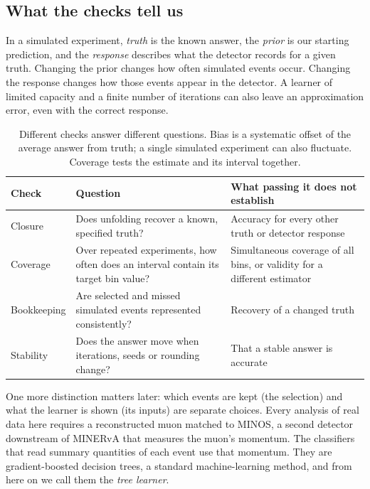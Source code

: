 \subsection*{What the checks tell us}

In a simulated experiment, \emph{truth} is the known answer, the \emph{prior} is our starting prediction, and the \emph{response} describes what the detector records for a given truth. Changing the prior changes how often simulated events occur. Changing the response changes how those events appear in the detector. A learner of limited capacity and a finite number of iterations can also leave an approximation error, even with the correct response.

\begin{table}[H]
\centering\small
\begin{tabular}{@{}p{}p{}p{}@{}}
\toprule
Check & Question & What passing it does not establish \\
\midrule
Closure & Does unfolding recover a known, specified truth? & Accuracy for every other truth or detector response \\
\addlinespace
Coverage & Over repeated experiments, how often does an interval contain its target bin value? & Simultaneous coverage of all bins, or validity for a different estimator \\
\addlinespace
Bookkeeping & Are selected and missed simulated events represented consistently? & Recovery of a changed truth \\
\addlinespace
Stability & Does the answer move when iterations, seeds or rounding change? & That a stable answer is accurate \\
\bottomrule
\end{tabular}
\caption{Different checks answer different questions. Bias is a systematic offset of the average answer from truth; a single simulated experiment can also fluctuate. Coverage tests the estimate and its interval together.}
\end{table}

One more distinction matters later: which events are kept (the selection) and what the learner is shown (its inputs) are separate choices. Every analysis of real data here requires a reconstructed muon matched to MINOS, a second detector downstream of MINERvA that measures the muon's momentum. The classifiers that read summary quantities of each event use that momentum. They are gradient-boosted decision trees, a standard machine-learning method, and from here on we call them the \emph{tree learner}.

